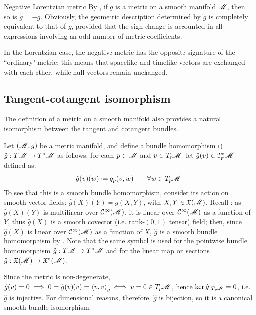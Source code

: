 \begin{observation}{Negative Lorentzian metric}{}
  By , if $ g $ is a metric on a smooth manifold $ \mathscr{M} $, then so is $ \tilde{g} = - g $. Obviously, the geometric description determined by $ \tilde{g} $ is completely equivalent to that of $ g $, provided that the sign change is accounted in all expressions involving an odd number of metric coefficients.

  In the Lorentzian case, the negative metric has the opposite signature of the ``ordinary" metric: this means that spacelike and timelike vectors are exchanged with each other, while null vectors remain unchanged.
\end{observation}

\subsection{Tangent-cotangent isomorphism}
\label{ssec:tan-cot-isomorphism}

The definition of a metric on a smooth manifold also provides a natural isomorphism between the tangent and cotangent bundles.

Let $ (\mathscr{M},g) $ be a metric manifold, and define a bundle homomorphism () $ \hat{g} : T\mathscr{M} \rightarrow T^*\mathscr{M} $ as follows: for each $ p \in \mathscr{M} $ and $ v \in T_p\mathscr{M} $, let $ \hat{g}(v) \in T_p^*\mathscr{M} $ defined as:
\begin{equation}
  \hat{g}(v)(w) \defeq g_p(v,w)
  \qquad
  \forall w \in T_p\man
\end{equation}
To see that this is a smooth bundle homomorphism, consider its action on smooth vector fields: $ \hat{g}(X)(Y) = g(X,Y) $, with $ X,Y \in \mathfrak{X}(\mathscr{M}) $. Recall : as $ \hat{g}(X)(Y) $ is multilinear over $ \mathcal{C}^{\infty}(\mathscr{M}) $, it is linear over $ \mathcal{C}^{\infty}(\mathscr{M}) $ as a function of $ Y $, thus $ \hat{g}(X) $ is a smooth covector (i.e. rank-$ (0,1) $ tensor) field; then, since $ \hat{g}(X) $ is linear over $ \mathcal{C}^{\infty}(\mathscr{M}) $ as a function of $ X $, $ \hat{g} $ is a smooth bundle homomorphism by . Note that the same symbol is used for the pointwise bundle homomorphism $ \hat{g} : T\mathscr{M} \rightarrow T^*\mathscr{M} $ and for the linear map on sections $ \hat{g} : \mathfrak{X}(\mathscr{M}) \rightarrow \mathfrak{X}^*(\mathscr{M}) $.

Since the metric is non-degenerate, $ \hat{g}(v) = 0 \implies 0 = \hat{g}(v)(v) = \braket{v,v}_g \iff v = 0 \in T_p\mathscr{M} $, hence $ \ker \hat{g}\vert_{T_p\mathscr{M}} = 0 $, i.e. $ \hat{g} $ is injective. For dimensional reasons, therefore, $ \hat{g} $ is bijection, so it is a canonical smooth bundle isomorphism.

